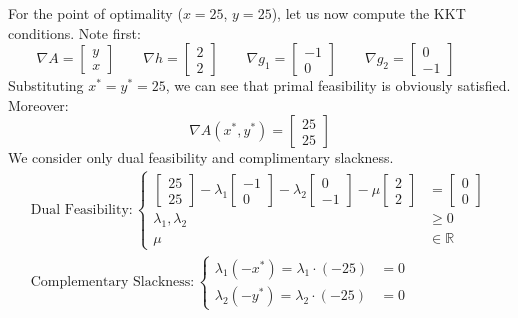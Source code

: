 For the point of optimality ($x=25$, $y=25$), let us now compute the KKT conditions. Note first:
\begin{displaymath}
\nabla A = \begin{bmatrix}y\\x\end{bmatrix} \quad \quad 
\nabla h = \begin{bmatrix}2\\2\end{bmatrix} \quad \quad 
\nabla g_1 = \begin{bmatrix}-1\\0\end{bmatrix} \quad \quad 
\nabla g_2 = \begin{bmatrix}0\\-1\end{bmatrix} \quad \quad 
\end{displaymath}
Substituting $x^* = y^* = 25$, we can see that primal feasibility is obviously satisfied. Moreover:
\begin{displaymath}
\nabla A(x^*,y^*) = \begin{bmatrix}25\\25\end{bmatrix}
\end{displaymath}
We  consider only dual feasibility and complimentary slackness. 
\begin{gather*}
\text{Dual Feasibility}:\left\{
\begin{aligned}
\begin{bmatrix}25\\25\end{bmatrix} -\lambda_1\begin{bmatrix}-1\\0\end{bmatrix} - 
\lambda_2\begin{bmatrix}0\\-1\end{bmatrix} - \mu\begin{bmatrix}2\\2\end{bmatrix} &= \begin{bmatrix}0\\0\end{bmatrix}\\
\lambda_1,\lambda_2 & \geq 0\\
\mu &\in \mathbb{R}
\end{aligned}
\right.\\
\text{Complementary Slackness}:\left\{
\begin{aligned}
\lambda_1(-x^*) = \lambda_1\cdot(-25) &= 0\\
\lambda_2(-y^*) = \lambda_2\cdot(-25) &= 0
\end{aligned}
\right.
\end{gather*}

